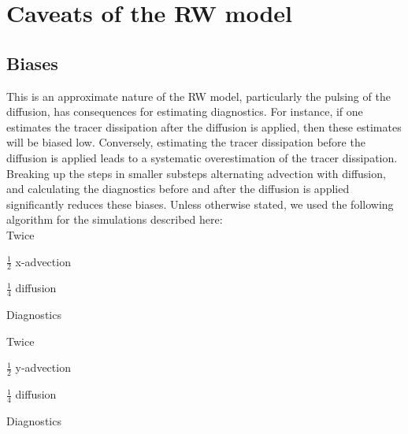 \documentclass[11pt]{article}
\begin{document}
\clearpage

\appendix

\section{Caveats of the RW model}

\subsection{Biases}
 This is an approximate nature of the RW model, particularly the pulsing of the diffusion, has consequences for estimating diagnostics. For instance, if one estimates the tracer dissipation after the diffusion is applied, then these estimates will be biased low. Conversely, estimating the tracer dissipation before the diffusion is applied leads to a systematic overestimation of the tracer dissipation. Breaking up the steps in smaller substeps alternating advection with diffusion, and calculating the diagnostics before and after the diffusion is applied significantly reduces these biases. Unless otherwise stated, we used the following algorithm for the simulations described here: \\


\noindent Twice
\begin{description}
\item  $\tfrac{1}{2}$ x-advection
\item   $\tfrac{1}{4}$ diffusion
\item   Diagnostics
\end{description}

\noindent  Twice
\begin{description}
\item  $\tfrac{1}{2}$ y-advection
\item   $\tfrac{1}{4}$ diffusion
\item   Diagnostics
\end{description}
\end{document}
